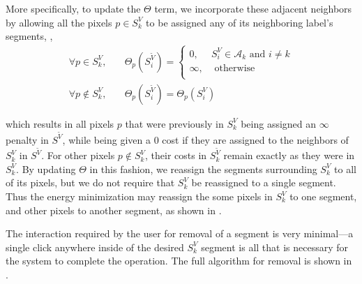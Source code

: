 \documentclass[]{spie}  %
\begin{document}
More specifically, to update the $\Theta$ term, we incorporate these
adjacent neighbors by allowing all the pixels $p\in S^V_k$ to be
assigned any of its neighboring label's segments, \ie,
\begin{equation}\label{eq:remove}
\begin{aligned}
 \forall p \in S^V_k ,& \quad \Theta_p(S^{\tilde{V}}_i) = \left\{
   \begin{array}{lcr}
     0, & S^V_i \in \mathcal{A}_k \textrm{ and } i \neq k  \\
     \infty, & \textrm{ otherwise} \\
   \end{array}
 \right. \\
\forall p \notin S^V_k ,& \quad \Theta_p(S^{\tilde{V}}_i) = \Theta_p(S^V_i)
\end{aligned}
\end{equation}


which results in all pixels $p$ that were previously in $S^V_k$ being
assigned an $\infty$ penalty in $S^{\tilde{V}}$, while being given a $0$
cost if they are assigned to the neighbors of $S^V_k$ in
$S^{\tilde{V}}$.  For other pixels $p\notin S^V_k$, their costs in
$S^{\tilde{V}}_k$ remain exactly as they were in $S^V_k$.  By updating
$\Theta$ in this fashion, we reassign the segments surrounding $S^V_k$
to all of its pixels, but we do not require that $S^V_k$ be reassigned
to a single segment.  Thus the energy minimization may reassign the
some pixels in $S^V_k$ to one segment, and other pixels to another
segment, as shown in .

The interaction required by the user for removal of a segment is very
minimal---a single click anywhere inside of the desired $S^V_k$
segment is all that is necessary for the system to complete the
operation.  The full algorithm for removal is shown in .
\end{document}

